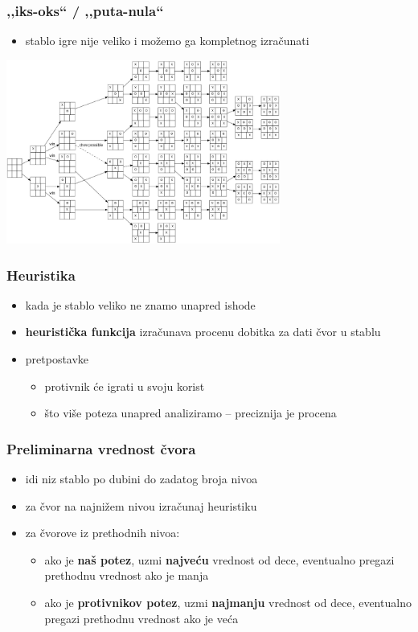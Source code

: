 \documentclass[compress,aspectratio=169]{beamer}
\begin{document}
\begin{frame}[fragile]
  \frametitle{,,iks-oks`` / ,,puta-nula``}
  \begin{itemize}
    \item stablo igre nije veliko i možemo ga kompletnog izračunati
  \end{itemize}
  \begin{center}
    \includegraphics[width=9cm]{prj-01-pic09.png}
  \end{center}
\end{frame}

\begin{frame}[fragile]
  \frametitle{Heuristika}
  \begin{itemize}
    \item kada je stablo veliko ne znamo unapred ishode
    \item \textbf{heuristička funkcija} izračunava procenu dobitka za dati čvor u stablu
    \item pretpostavke
    \begin{itemize}
      \item protivnik će igrati u svoju korist
      \item što više poteza unapred analiziramo -- preciznija je procena
    \end{itemize}
  \end{itemize}
\end{frame}

\begin{frame}[fragile]
  \frametitle{Preliminarna vrednost čvora}
  \begin{itemize}
    \item idi niz stablo po dubini do zadatog broja nivoa
    \item za čvor na najnižem nivou izračunaj heuristiku
    \item za čvorove iz prethodnih nivoa:
    \begin{itemize}
      \item ako je \textbf{naš potez}, uzmi \textbf{najveću} vrednost od dece, eventualno pregazi prethodnu vrednost ako je manja
      \item ako je \textbf{protivnikov potez}, uzmi \textbf{najmanju} vrednost od dece, eventualno pregazi prethodnu vrednost ako je veća
    \end{itemize}
  \end{itemize}
\end{frame}
\end{document}
